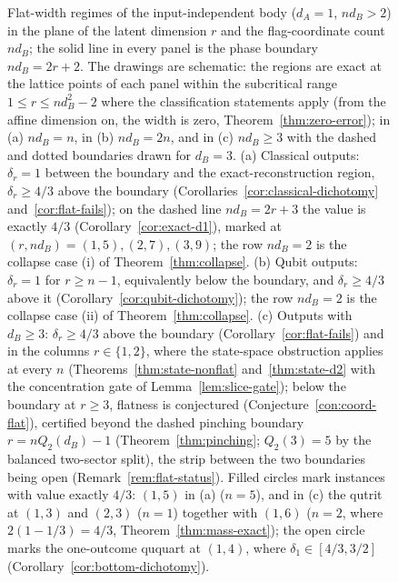 \begin{figure}[t]
\caption{Flat-width regimes of the input-independent body ($d_A=1$, $nd_B>2$) in the plane of the latent dimension $r$ and the flag-coordinate count $nd_B$; the solid line in every panel is the phase boundary $nd_B=2r+2$. The drawings are schematic: the regions are exact at the lattice points of each panel within the subcritical range $1\le r\le nd_B^2-2$ where the classification statements apply (from the affine dimension on, the width is zero, Theorem~\ref{thm:zero-error}); in (a) $nd_B=n$, in (b) $nd_B=2n$, and in (c) $nd_B\ge3$ with the dashed and dotted boundaries drawn for $d_B=3$. (a) Classical outputs: $\delta_r=1$ between the boundary and the exact-reconstruction region, $\delta_r\ge4/3$ above the boundary (Corollaries~\ref{cor:classical-dichotomy} and~\ref{cor:flat-fails}); on the dashed line $nd_B=2r+3$ the value is exactly $4/3$ (Corollary~\ref{cor:exact-d1}), marked at $(r,nd_B)=(1,5),(2,7),(3,9)$; the row $nd_B=2$ is the collapse case (i) of Theorem~\ref{thm:collapse}. (b) Qubit outputs: $\delta_r=1$ for $r\ge n-1$, equivalently below the boundary, and $\delta_r\ge4/3$ above it (Corollary~\ref{cor:qubit-dichotomy}); the row $nd_B=2$ is the collapse case (ii) of Theorem~\ref{thm:collapse}. (c) Outputs with $d_B\ge3$: $\delta_r\ge4/3$ above the boundary (Corollary~\ref{cor:flat-fails}) and in the columns $r\in\{1,2\}$, where the state-space obstruction applies at every $n$ (Theorems~\ref{thm:state-nonflat} and~\ref{thm:state-d2} with the concentration gate of Lemma~\ref{lem:slice-gate}); below the boundary at $r\ge3$, flatness is conjectured (Conjecture~\ref{con:coord-flat}), certified beyond the dashed pinching boundary $r=nQ_2(d_B)-1$ (Theorem~\ref{thm:pinching}; $Q_2(3)=5$ by the balanced two-sector split), the strip between the two boundaries being open (Remark~\ref{rem:flat-status}). Filled circles mark instances with value exactly $4/3$: $(1,5)$ in (a) ($n=5$), and in (c) the qutrit at $(1,3)$ and $(2,3)$ ($n=1$) together with $(1,6)$ ($n=2$, where $2(1-1/3)=4/3$, Theorem~\ref{thm:mass-exact}); the open circle marks the one-outcome ququart at $(1,4)$, where $\delta_1\in[4/3,3/2]$ (Corollary~\ref{cor:bottom-dichotomy}).}
\label{fig:flat-regimes}
\end{figure}

